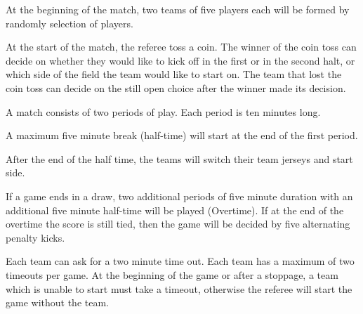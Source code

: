 \documentclass[12pt]{hurocup}
\begin{document}
\begin{lawlist}[US]
\item At the beginning of the match, two teams of five players each
  will be formed by randomly selection of players.

\item At the start of the match, the referee toss a coin. The winner
  of the coin toss can decide on whether they would like to kick off
  in the first or in the second halt, or which side of the field the
  team would like to start on. The team that lost the coin toss can
  decide on the still open choice after the winner made its
  decision.
  
\item A match consists of two periods of play. Each period is ten
  minutes long.

\item A maximum five minute break (half-time) will start at the end of
  the first period.

\item After the end of the half time, the teams will switch their team jerseys
  and start side.

\item If a game ends in a draw, two additional periods of five minute
  duration with an additional five minute half-time will be played
  (Overtime). If at the end of the overtime the score is still tied,
  then the game will be decided by five alternating penalty kicks.

\item Each team can ask for a two minute time out. Each team has a
  maximum of two timeouts per game. At the beginning of the game or
  after a stoppage, a team which is unable to start must take a
  timeout, otherwise the referee will start the game without the team.

\end{lawlist}

\end{document}
